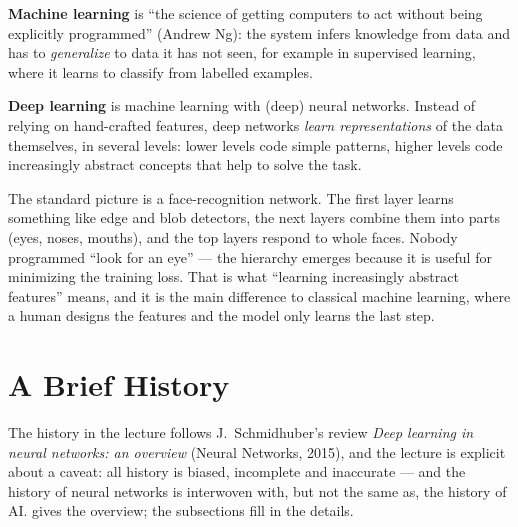 \documentclass[11pt, oneside]{book}
\let\originalsection\section
\renewcommand{\section}{\Needspace{7\baselineskip}\originalsection}
\begin{document}
\begin{defbox}[title={Machine learning and deep learning}]
\textbf{Machine learning} is ``the science of getting computers to act
without being explicitly programmed'' (Andrew Ng): the system infers
knowledge from data and has to \emph{generalize} to data it has not seen,
for example in supervised learning, where it learns to classify from
labelled examples.

\textbf{Deep learning} is machine learning with (deep) neural networks.
Instead of relying on hand-crafted features, deep networks \emph{learn
representations} of the data themselves, in several levels: lower levels
code simple patterns, higher levels code increasingly abstract concepts that
help to solve the task.
\end{defbox}

\begin{intbox}
The standard picture is a face-recognition network. The first layer learns
something like edge and blob detectors, the next layers combine them into
parts (eyes, noses, mouths), and the top layers respond to whole faces.
Nobody programmed ``look for an eye'' --- the hierarchy emerges because it is
useful for minimizing the training loss. That is what ``learning increasingly
abstract features'' means, and it is the main difference to classical machine
learning, where a human designs the features and the model only learns the
last step.
\end{intbox}

\section{A Brief History}
\label{sec:history}

The history in the lecture follows J.~Schmidhuber's review \emph{Deep
learning in neural networks: an overview} (Neural Networks, 2015), and the
lecture is explicit about a caveat: all history is biased, incomplete and
inaccurate --- and the history of neural networks is interwoven with, but
not the same as, the history of AI.  gives the overview;
the subsections fill in the details.
\end{document}
